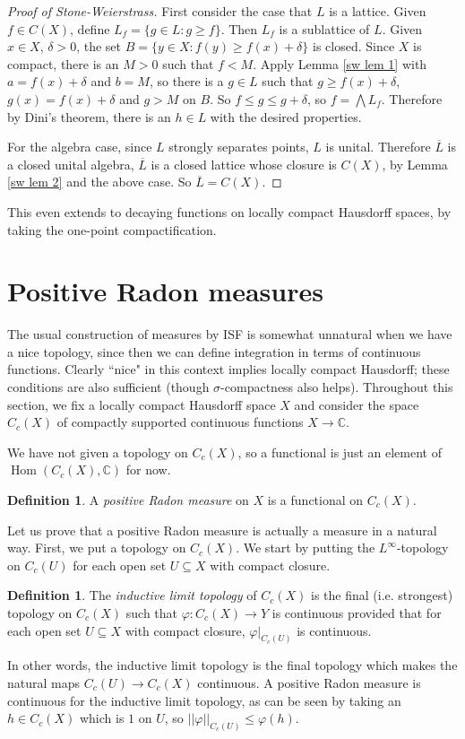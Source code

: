 \documentclass[12pt]{report}
\newcommand{\CC}{\mathbb{C}}
\newcommand{\Hom}{\operatorname{Hom}}
\newcommand{\dfn}[1]{\emph{#1}\index{#1}}
\theoremstyle{definition}
\newtheorem{definition}[theorem]{Definition}
\begin{document}
\begin{proof}[Proof of Stone-Weierstrass]
    First consider the case that $L$ is a lattice. Given $f \in C(X)$, define $L_f = \{g \in L: g \geq f\}$. Then $L_f$ is a sublattice of $L$. Given $x \in X$, $\delta > 0$, the set $B = \{y \in X: f(y) \geq f(x) + \delta\}$ is closed. Since $X$ is compact, there is an $M > 0$ such that $f < M$. Apply Lemma \ref{sw lem 1} with $a = f(x) + \delta$ and $b = M$, so there is a $g \in L$ such that $g \geq f(x) + \delta$, $g(x) = f(x) + \delta$ and $g > M$ on $B$. So $f \leq g \leq g + \delta$, so $f = \bigwedge L_f$. Therefore by Dini's theorem, there is an $h \in L$ with the desired properties.
    
    For the algebra case, since $L$ strongly separates points, $L$ is unital. Therefore $\overline L$ is a closed unital algebra, $\overline L$ is a closed lattice whose closure is $C(X)$, by Lemma \ref{sw lem 2} and the above case. So $\overline L = C(X)$.
\end{proof}
This even extends to decaying functions on locally compact Hausdorff spaces, by taking the one-point compactification.

\section{Positive Radon measures}
The usual construction of measures by ISF is somewhat unnatural when we have a nice topology, since then we can define integration in terms of continuous functions. Clearly ``nice" in this context implies locally compact Hausdorff; these conditions are also sufficient (though $\sigma$-compactness also helps). Throughout this section, we fix a locally compact Hausdorff space $X$ and consider the space $C_c(X)$ of compactly supported continuous functions $X \to \CC$.

We have not given a topology on $C_c(X)$, so a functional is just an element of $\Hom(C_c(X), \CC)$ for now.
\begin{definition}
    A \dfn{positive Radon measure} on $X$ is a functional on $C_c(X)$.
\end{definition}
Let us prove that a positive Radon measure is actually a measure in a natural way. First, we put a topology on $C_c(X)$. We start by putting the $L^\infty$-topology on $C_c(U)$ for each open set $U \subseteq X$ with compact closure.
\begin{definition}
    The \dfn{inductive limit topology} of $C_c(X)$ is the final (i.e. strongest) topology on $C_c(X)$ such that $\varphi: C_c(X) \to Y$ is continuous provided that for each open set $U \subseteq X$ with compact closure, $\varphi|_{C_c(U)}$ is continuous.
\end{definition}
In other words, the inductive limit topology is the final topology which makes the natural maps $C_c(U) \to C_c(X)$ continuous. A positive Radon measure is continuous for the inductive limit topology, as can be seen by taking an $h \in C_c(X)$ which is $1$ on $U$, so $||\varphi||_{C_c(U)} \leq \varphi(h)$.
\end{document}
